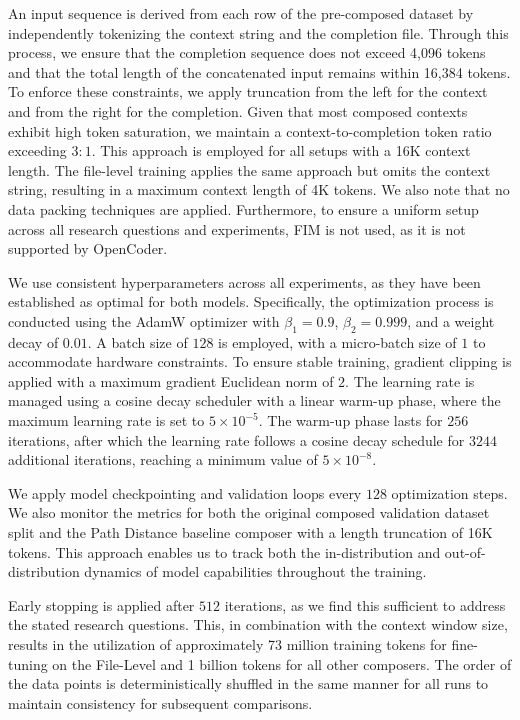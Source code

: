 An input sequence is derived from each row of the pre-composed dataset by independently tokenizing the context string and the completion file. Through this process, we ensure that the completion sequence does not exceed 4,096 tokens and that the total length of the concatenated input remains within 16,384 tokens. To enforce these constraints, we apply truncation from the left for the context and from the right for the completion. Given that most composed contexts exhibit high token saturation, we maintain a context-to-completion token ratio exceeding \(3 : 1\). \parencite{sapronov2025} This approach is employed for all setups with a 16K context length. The file-level training applies the same approach but omits the context string, resulting in a maximum context length of 4K tokens. We also note that no data packing techniques are applied. Furthermore, to ensure a uniform setup across all research questions and experiments, FIM is not used, as it is not supported by OpenCoder.

We use consistent hyperparameters across all experiments, as they have been established as optimal for both models. Specifically, the optimization process is conducted using the AdamW optimizer with \(\beta_1 = 0.9\), \(\beta_2 = 0.999\), and a weight decay of \(0.01\). A batch size of \(128\) is employed, with a micro-batch size of \(1\) to accommodate hardware constraints. To ensure stable training, gradient clipping is applied with a maximum gradient Euclidean norm of \(2\). The learning rate is managed using a cosine decay scheduler with a linear warm-up phase, where the maximum learning rate is set to \(5 \times 10^{-5}\). The warm-up phase lasts for \(256\) iterations, after which the learning rate follows a cosine decay schedule for \(3244\) additional iterations, reaching a minimum value of \(5 \times 10^{-8}\). \parencite{sapronov2025}

We apply model checkpointing and validation loops every \(128\) optimization steps. We also monitor the metrics for both the original composed validation dataset split and the Path Distance baseline composer with a length truncation of 16K tokens. This approach enables us to track both the in-distribution and out-of-distribution dynamics of model capabilities throughout the training.

Early stopping is applied after \(512\) iterations, as we find this sufficient to address the stated research questions. This, in combination with the context window size, results in the utilization of approximately 73 million training tokens for fine-tuning on the File-Level and 1 billion tokens for all other composers. The order of the data points is deterministically shuffled in the same manner for all runs to maintain consistency for subsequent comparisons.

